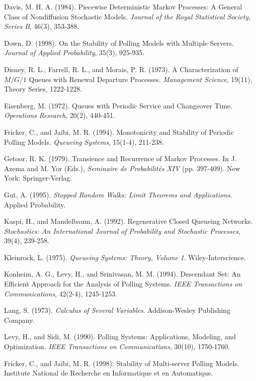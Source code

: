 \begin{thebibliography}{99}
 Davis, M. H. A. (1984). Piecewise Deterministic Markov Processes: A General Class of Nondiffusion Stochastic Models. \textit{Journal of the Royal Statistical Society, Series B}, 46(3), 353-388.

 Down, D. (1998). On the Stability of Polling Models with Multiple Servers. \textit{Journal of Applied Probability}, 35(3), 925-935.

 Disney, R. L., Farrell, R. L., and Morais, P. R. (1973). A Characterization of $M/G/1$ Queues with Renewal Departure Processes. \textit{Management Science}, 19(11), Theory Series, 1222-1228.

 Eisenberg, M. (1972). Queues with Periodic Service and Changeover Time. \textit{Operations Research}, 20(2), 440-451.

 Fricker, C., and Jaïbi, M. R. (1994). Monotonicity and Stability of Periodic Polling Models. \textit{Queueing Systems}, 15(1-4), 211-238.

 Getoor, R. K. (1979). Transience and Recurrence of Markov Processes. In J. Azema and M. Yor (Eds.), \textit{Seminaire de Probabilités XIV} (pp. 397-409). New York: Springer-Verlag.

 Gut, A. (1995). \textit{Stopped Random Walks: Limit Theorems and Applications}. Applied Probability.

 Kaspi, H., and Mandelbaum, A. (1992). Regenerative Closed Queueing Networks. \textit{Stochastics: An International Journal of Probability and Stochastic Processes}, 39(4), 239-258.

 Kleinrock, L. (1975). \textit{Queueing Systems: Theory, Volume 1}. Wiley-Interscience.

 Konheim, A. G., Levy, H., and Srinivasan, M. M. (1994). Descendant Set: An Efficient Approach for the Analysis of Polling Systems. \textit{IEEE Transactions on Communications}, 42(2-4), 1245-1253.

 Lang, S. (1973). \textit{Calculus of Several Variables}. Addison-Wesley Publishing Company.

 Levy, H., and Sidi, M. (1990). Polling Systems: Applications, Modeling, and Optimization. \textit{IEEE Transactions on Communications}, 30(10), 1750-1760.

 Fricker, C., and Jaïbi, M. R. (1998). Stability of Multi-server Polling Models. Institute National de Recherche en Informatique et en Automatique.


\end{thebibliography}
